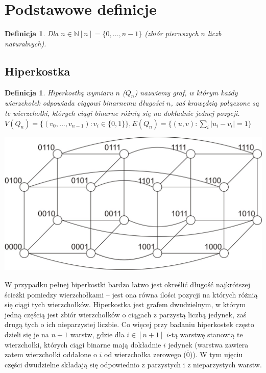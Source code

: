 \documentclass{pracamgr}
\newtheorem{defi}[theorem]{Definicja}
\begin{document}
  \section{Podstawowe definicje}
   \begin{defi}\label{[n]}
    Dla $n\in\mathbb{N}$\quad $[n]=\{0,...,n-1\}$ (zbiór pierwszych $n$ liczb naturalnych).
   \end{defi}
   \subsection{Hiperkostka}
    \begin{defi}\label{hiperkostka}
     \emph{Hiperkostką wymiaru $n$ ($Q_n$)} nazwiemy graf, w którym każdy wierzchołek odpowiada ciągowi binarnemu długości $n$,
     zaś krawędzią połączone są te wierzchołki, których ciągi binarne różnią się na dokładnie jednej pozycji.\newline
     $V(Q_n)=\{(v_0,...,v_{n-1}):v_i\in\{0,1\}\}, E(Q_n)=\{(u,v):\sum_{i}|u_i-v_i|=1\}$
    \end{defi}
    \begin{center}
     \includegraphics[scale=0.6]{img/Q_4.jpg}
    \end{center}
    W przypadku pełnej hiperkostki
    bardzo łatwo jest określić długość najkrótszej ścieżki pomiedzy wierzchołkami --
    jest ona równa ilości pozycji na których różnią się ciągi tych wierzchołków.\newline
    Hiperkostka jest grafem dwudzielnym, w którym jedną częścią jest zbiór wierzchołków o ciągach z parzystą liczbą jedynek,
    zaś drugą tych o ich nieparzystej liczbie.\newline
    Co więcej przy badaniu hiperkostek często dzieli się je na $n+1$ warstw, gdzie dla $i\in[n+1]$ $i$-tą warstwę stanowią te wierzchołki,
    których ciągi binarne mają dokładnie $i$ jedynek (warstwa zawiera zatem wierzchołki oddalone o $i$ od wierzchołka zerowego ($\overline{0}$)).
    W tym ujęciu części dwudzielne składają się odpowiednio z parzystych i z nieparzystych warstw.
    
\end{document}

